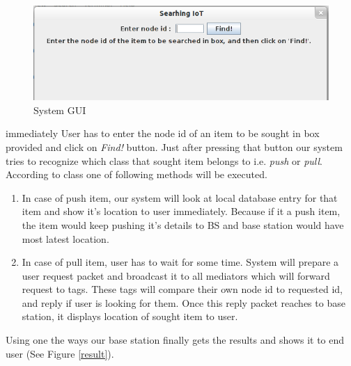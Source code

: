 \documentclass [a4paper,12pt]{book}
\begin{document}
\vspace{0.5cm}
\begin{figure}[!h]
\begin{center}
\includegraphics[scale=0.7]{images/15.png}
\caption{System GUI}
\label{gui}
\end{center}
\end{figure}
immediately
User has to enter the node id of an item to be sought in box provided and click on \emph{Find!} button. Just after pressing that button our system tries to recognize which class that sought item belongs to i.e. {\em push} or \emph{pull}. According to class one of following methods will be executed.

\begin{enumerate}[1.]
\item In case of push item, our system will look at local database entry for that item and show it's location to user immediately. Because if it a push item, the item would keep pushing it's details to BS and base station would have most latest location.
\item In case of pull item, user has to wait for some time. System will prepare a user request packet and broadcast it to all mediators which will forward request to tags. These tags will compare their own node id to requested id, and reply if user is looking for them. Once this reply packet reaches to base station, it displays location of sought item to user.
\end{enumerate}

Using one the ways our base station finally gets the results and shows it to end user (See Figure \ref{result}).
\end{document}
